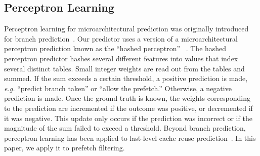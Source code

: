 \subsection{Perceptron Learning}
\label{sec:Background-Perceptron}
Perceptron learning for microarchitectural prediction was originally
introduced for branch prediction~\cite{PerceptronPredictor}.  Our
predictor uses a version of a microarchitectural perceptron prediction
known as the ``hashed perceptron'' ~\cite{HashedPerceptron}.  The
hashed perceptron predictor hashes several different features into
values that index several distinct tables. Small integer weights are
read out from the tables and summed. If the sum exceeds a certain
threshold, a positive prediction is made, {\em e.g.} ``predict branch
taken'' or ``allow the prefetch.'' Otherwise, a negative prediction is
made. Once the ground truth is known, the weights corresponding to the
prediction are incremented if the outcome was positive, or decremented
if it was negative. This update only occurs if the prediction was
incorrect or if the magnitude of the sum failed to exceed a threshold.
Beyond branch prediction, perceptron learning has been applied to
last-level cache reuse
prediction~\cite{Perc_Reuse,Multiperspective}. In this paper, we apply
it to prefetch filtering.
